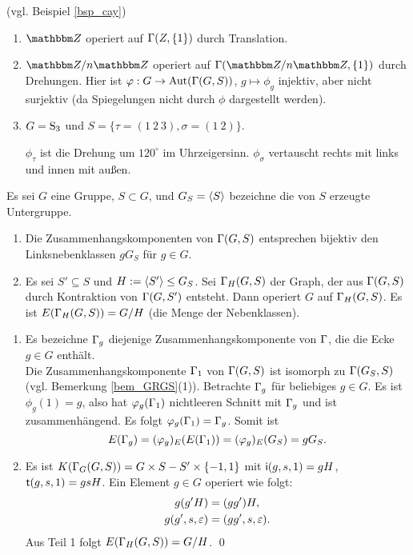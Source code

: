 \BSP (vgl. Beispiel \ref{bsp_cay})
\begin{enumerate}
\item $\ZZ$ operiert auf $\Gamma(Z,\{1\})$ durch Translation.
\item $\ZZ/n\ZZ$ operiert auf $\GR(\ZZ/n\ZZ,\{1\})$ durch
Drehungen. Hier ist $\varphi:G\rightarrow\mathrm{Aut}(\Gamma(G,S))$, $g\mapsto\phi_g$
injektiv, aber nicht surjektiv (da Spiegelungen nicht durch
$\phi$ dargestellt werden).
\item $G=\mathrm{S}_3$ und $S=\{\tau=(1\ 2\ 3), \sigma=(1\ 2)\}$.
\begin{center}
\end{center}
$\phi_{\tau}$ ist die Drehung um $120^{\circ}$ im
Uhrzeigersinn. $\phi_{\sigma}$ vertauscht rechts mit links und
innen mit außen.
\end{enumerate}

\PROP Es sei $G$ eine Gruppe, $S\subset G$, und $G_S=\langle S\rangle$
bezeichne die von $S$ erzeugte Untergruppe.
\begin{enumerate}
\item Die Zusammenhangskomponenten von $\Gamma(G,S)$ entsprechen
bijektiv den Linksnebenklassen $g G_S$ für $g\in G$.
\item Es sei $S'\subseteq S$ und $H:=\langle S'\rangle \leq G_S$.
Sei $\Gamma_H(G,S)$ der Graph, der aus $\Gamma(G,S)$ durch Kontraktion
von $\Gamma(G,S')$ entsteht.
Dann operiert $G$ auf $\Gamma_H(G,S)$.
Es ist $E(\Gamma_H(G,S)) = G/H$ (die Menge der Nebenklassen).
\end{enumerate}
\bew \begin{enumerate}
\item Es bezeichne $\Gamma_g$ diejenige Zusammenhangskomponente von
$\Gamma$, die die Ecke $g\in G$ enthält.\\
Die Zusammenhangskomponente $\Gamma_1$ von $\Gamma(G,S)$ ist isomorph
zu $\Gamma(G_S,S)$ (vgl. Bemerkung \ref{bem_GRGS}(1)).
Betrachte $\Gamma_g$ für beliebiges $g\in G$. Es ist $\phi_g(1)=g$,
also hat $\varphi_g(\Gamma_1)$ nichtleeren Schnitt mit $\Gamma_g$ und ist
zusammenhängend. Es folgt $\varphi_g(\Gamma_1)=\Gamma_g$.
Somit ist
\[
E(\Gamma_g)=(\varphi_g)_E(E(\Gamma_1))=(\varphi_g)_E(G_S) = g G_S.
\]
\item
Es ist $K(\Gamma_G(G,S))=G\times S-S'\times\{-1,1\}$ mit
$\mathsf{i}(g,s,1)=gH$, $\mathsf{t}(g,s,1)=gsH$.
Ein Element $g\in G$ operiert wie folgt:
\begin{align*}
g(g'H) &= (gg')H, \\
g(g',s,\varepsilon) &= (gg',s,\varepsilon).
\end{align*}
Aus Teil 1 folgt $E(\Gamma_H(G,S))=G/H$.
\qed
\end{enumerate}

